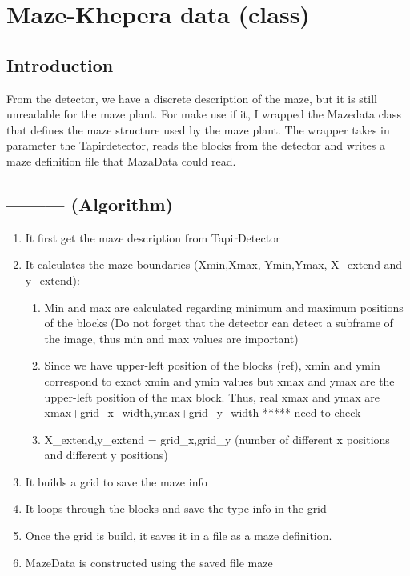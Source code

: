 \section{Maze-Khepera data (class)}

\subsection{Introduction}

From the detector, we have a discrete description of the maze, but it 
is still unreadable for the maze plant. For make use if it, I wrapped 
the Mazedata class that defines the maze structure used by the maze 
plant. The wrapper takes in parameter the Tapirdetector, reads the blocks 
from the detector and writes a maze definition file that MazaData 
could read.

\subsection{--------- (Algorithm)}
    \begin{enumerate}
        \item It first get the maze description from TapirDetector
        \item It calculates the maze boundaries (Xmin,Xmax, Ymin,Ymax, 
            X\_extend and y\_extend):
        \begin{enumerate}
            \item Min and max are calculated regarding minimum and maximum 
                positions of the blocks (Do not forget that the detector 
                can detect a subframe of the image, thus min and max 
                values are important)
            \item Since we have upper-left position of the blocks (ref), 
                xmin and ymin correspond to exact xmin and ymin values 
                but xmax and ymax are the upper-left position of the 
                max block. Thus, real xmax and ymax are 
                xmax+grid\_x\_width,ymax+grid\_y\_width   ***** need to check
            \item X\_extend,y\_extend = grid\_x,grid\_y (number of different 
                x positions and different y positions)
        \end{enumerate}
        \item It builds a grid to save the maze info
        \item It loops through the blocks and save the type info in the grid
        \item Once the grid is build, it saves it in a file as a maze 
            definition. 
        \item MazeData is constructed using the saved file maze
    \end{enumerate}

